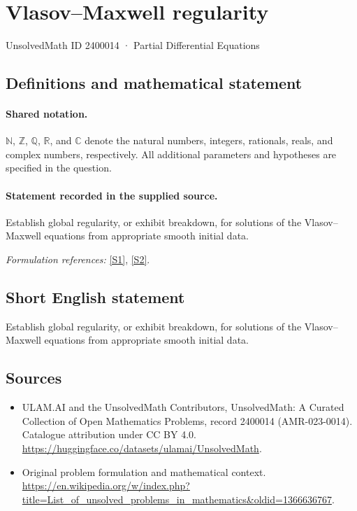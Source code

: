 \documentclass[11pt]{article}
\newcommand{\sref}[2]{\hyperlink{source:#1:#2}{[S#2]}}
\begin{document}
\setcounter{section}{2400013}
\section{Vlasov–Maxwell regularity}\label{2400014}
{\small UnsolvedMath ID 2400014 · Partial Differential Equations}
\subsection{Definitions and mathematical statement}

\paragraph{Shared notation.}$\mathbb N$, $\mathbb Z$, $\mathbb Q$, $\mathbb R$, and $\mathbb C$ denote the natural numbers, integers, rationals, reals, and complex numbers, respectively. All additional parameters and hypotheses are specified in the question.


\paragraph{Statement recorded in the supplied source.}
Establish global regularity, or exhibit breakdown, for solutions of the Vlasov–Maxwell equations from appropriate smooth initial data.
\par\smallskip\textit{Formulation references:} \sref{2400014}{1}, \sref{2400014}{2}.
\subsection{Short English statement}
Establish global regularity, or exhibit breakdown, for solutions of the Vlasov–Maxwell equations from appropriate smooth initial data.
\subsection{Sources}
\begin{itemize}
\item[\hypertarget{source:2400014:1}{S1}] ULAM.AI and the UnsolvedMath Contributors, UnsolvedMath: A Curated Collection of Open Mathematics Problems, record 2400014 (AMR-023-0014). Catalogue attribution under CC BY 4.0.
\url{https://huggingface.co/datasets/ulamai/UnsolvedMath}.
\item[\hypertarget{source:2400014:2}{S2}] Original problem formulation and mathematical context.
\url{https://en.wikipedia.org/w/index.php?title=List_of_unsolved_problems_in_mathematics&oldid=1366636767}.
\end{itemize}
\label{end:2400014}
\end{document}

